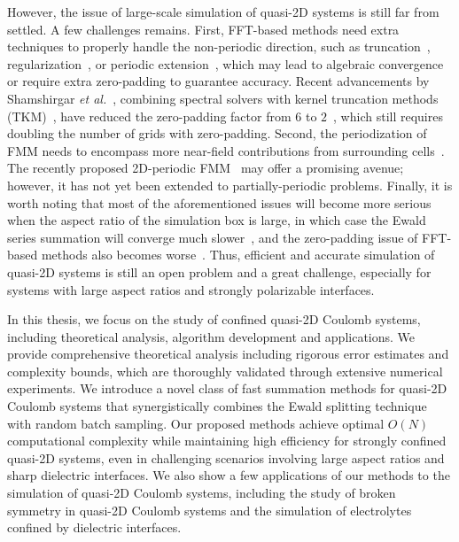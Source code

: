 However, the issue of large-scale simulation of quasi-2D systems is still far from settled.
A few challenges remains. First, FFT-based methods need extra techniques to properly handle the non-periodic direction, such as truncation~\cite{parry1975electrostatic}, regularization~\cite{nestler2015fast}, or periodic extension~\cite{lindbo2012fast}, which may lead to algebraic convergence or require extra zero-padding to guarantee accuracy. 
Recent advancements by Shamshirgar \emph{et al.}~\cite{shamshirgar2021fast}, combining spectral solvers with kernel truncation methods (TKM)~\cite{vico2016fast}, have reduced the zero-padding factor from $6$ to $2$~\cite{lindbo2012fast}, which still requires doubling the number of grids with zero-padding. 
Second, the periodization of FMM needs to encompass more near-field contributions from surrounding cells~\cite{yan2018flexibly,barnett2018unified}. The recently proposed 2D-periodic FMM~\cite{PEI2023111792} may offer a promising avenue; however, it has not yet been extended to partially-periodic problems.
Finally, it is worth noting that most of the aforementioned issues will become more serious when the aspect ratio of the simulation box is large, in which case the Ewald series summation will converge much slower~\cite{arnold2002electrostatics}, and the zero-padding issue of FFT-based methods also becomes worse~\cite{maxian2021fast}.
Thus, efficient and accurate simulation of quasi-2D systems is still an open problem and a great challenge, especially for systems with large aspect ratios and strongly polarizable interfaces.


In this thesis, we focus on the study of confined quasi-2D Coulomb systems, including theoretical analysis, algorithm development and applications.
We provide comprehensive theoretical analysis including rigorous error estimates and complexity bounds, which are thoroughly validated through extensive numerical experiments.
We introduce a novel class of fast summation methods for quasi-2D Coulomb systems that synergistically combines the Ewald splitting technique with random batch sampling. 
Our proposed methods achieve optimal $O(N)$ computational complexity while maintaining high efficiency for strongly confined quasi-2D systems, even in challenging scenarios involving large aspect ratios and sharp dielectric interfaces. 
We also show a few applications of our methods to the simulation of quasi-2D Coulomb systems, including the study of broken symmetry in quasi-2D Coulomb systems and the simulation of electrolytes confined by dielectric interfaces.

